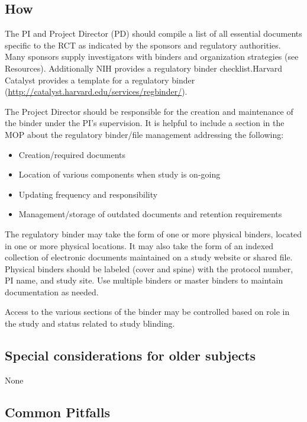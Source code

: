\documentclass[]{book}
\providecommand{\tightlist}{%
  \setlength{\itemsep}{0pt}\setlength{\parskip}{0pt}}
\begin{document}
\subsection{How}\label{how-16}

The PI and Project Director (PD) should compile a list of all essential
documents specific to the RCT as indicated by the sponsors and
regulatory authorities. Many sponsors supply investigators with binders
and organization strategies (see Resources). Additionally NIH provides a
regulatory binder checklist.Harvard Catalyst provides a template for a
regulatory binder
(\url{http://catalyst.harvard.edu/services/regbinder/}).

The Project Director should be responsible for the creation and
maintenance of the binder under the PI's supervision. It is helpful to
include a section in the MOP about the regulatory binder/file management
addressing the following:

\begin{itemize}
\tightlist
\item
  Creation/required documents
\item
  Location of various components when study is on-going
\item
  Updating frequency and responsibility
\item
  Management/storage of outdated documents and retention requirements
\end{itemize}

The regulatory binder may take the form of one or more physical binders,
located in one or more physical locations. It may also take the form of
an indexed collection of electronic documents maintained on a study
website or shared file. Physical binders should be labeled (cover and
spine) with the protocol number, PI name, and study site. Use multiple
binders or master binders to maintain documentation as needed.

Access to the various sections of the binder may be controlled based on
role in the study and status related to study blinding.

\subsection{Special considerations for older
subjects}\label{special-considerations-for-older-subjects-11}

None

\subsection{Common Pitfalls}\label{common-pitfalls-14}
\end{document}
